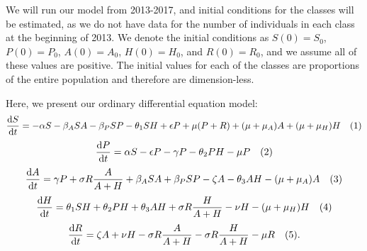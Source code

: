 \documentclass[12pt]{article}
\begin{document}
We will run our model from 2013-2017, and initial conditions for the classes will be estimated, as we do not have data for the number of individuals in each class at the beginning of 2013.  
We denote the initial conditions as
$S(0)=S_{0}$, $P(0)=P_{0}$, $A(0)=A_{0}$, $H(0)=H_{0}$, and $R(0)=R_{0}$, and we assume all of these values are positive. The initial values for each of the classes are proportions of the entire population and therefore are dimension-less.

 
Here, we present our ordinary differential equation model: %
\[\dv{S}{t} = -\alpha S - \beta_{A} SA  -\beta_{P} SP- \theta_{1} SH +\epsilon P +\mu (P+R) + (\mu+\mu_{A})A + (\mu+\mu_{H}) H \quad (1)\] 
\[\dv{P}{t} = \alpha S - \epsilon P  - \gamma P - \theta_{2}PH- \mu P    \quad(2)\]
\[\dv{A}{t} = \gamma P + \sigma R \frac{A}{A+H} +\beta_{A} SA  +\beta_{P} SP -\zeta A - \theta_{3}AH-(\mu + \mu_{A})A   \quad (3)\]
\[\dv{H}{t} = \theta_{1}SH+\theta_{2}PH+\theta_{3}AH + \sigma R \frac{H}{A+H}-\nu H-(\mu+\mu_{H})H  \quad (4)\]
\[\dv{R}{t} = \zeta A +\nu H -\sigma R \frac{A}{A+H}-\sigma R \frac{H}{A+H} -\mu R\quad(5).\]
\end{document}
